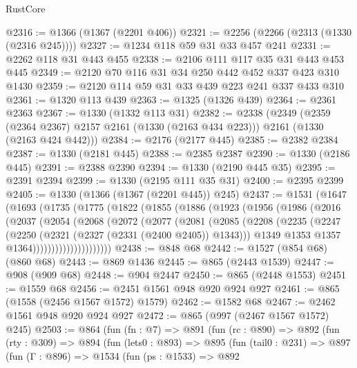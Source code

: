 \begin{lexlean}{RustCore}
\begin{coremodule}
@2316 := @1366 (@1367 (@2201 @406))
@2321 := @2256 (@2266 (@2313 (@1330 (@2316 @245))))
@2327 := @1234 @118 @59 @31 @33 @457 @241
@2331 := @2262 @118 @31 @443 @455
@2338 := @2106 @111 @117 @35 @31 @443 @453 @445
@2349 := @2120 @70 @116 @31 @34 @250 @442 @452 @337 @423 @310 @1430
@2359 := @2120 @114 @59 @31 @33 @439 @223 @241 @337 @433 @310
@2361 := @1320 @113 @439
@2363 := @1325 (@1326 @439)
@2364 := @2361 @2363
@2367 := @1330 (@1332 @113 @31)
@2382 := @2338
    (@2349
      (@2359 (@2364 @2367) @2157 @2161 (@1330 (@2163 @434 @223)))
      @2161
      (@1330 (@2163 @424 @442)))
@2384 := @2176 (@2177 @445)
@2385 := @2382 @2384
@2387 := @1330 (@2181 @445)
@2388 := @2385 @2387
@2390 := @1330 (@2186 @445)
@2391 := @2388 @2390
@2394 := @1330 (@2190 @445 @35)
@2395 := @2391 @2394
@2399 := @1330 (@2195 @111 @35 @31)
@2400 := @2395 @2399
@2405 := @1330 (@1366 (@1367 (@2201 @445)) @245)
@2437 := @1531
    (@1647
      (@1693
        (@1735
          (@1775
            (@1822
              (@1855
                (@1886
                  (@1923
                    (@1956
                      (@1986
                        (@2016
                          (@2037
                            (@2054
                              (@2068
                                (@2072
                                  (@2077
                                    (@2081
                                      (@2085
                                        (@2208
                                          (@2235
                                            (@2247
                                              (@2250 (@2321 (@2327 (@2331 (@2400 @2405)) @1343)))
                                              @1349
                                              @1353
                                              @1357
                                              @1364)))))))))))))))))))))
@2438 := @848 @68
@2442 := @1527 (@854 @68) (@860 @68)
@2443 := @869 @1436
@2445 := @865 (@2443 @1539)
@2447 := @908 (@909 @68)
@2448 := @904 @2447
@2450 := @865 (@2448 @1553)
@2451 := @1559 @68
@2456 := @2451 @1561 @948 @920 @924 @927
@2461 := @865 (@1558 (@2456 @1567 @1572) @1579)
@2462 := @1582 @68
@2467 := @2462 @1561 @948 @920 @924 @927
@2472 := @865 (@997 (@2467 @1567 @1572) @245)
@2503 := @864
    (fun (fn : @7) =>
    @891
      (fun (rc : @890) =>
      @892
        (fun (rty : @309) =>
        @894
          (fun (lets0 : @893) =>
          @895
            (fun (tail0 : @231) =>
            @897
              (fun (Γ : @896) =>
              @1534
                (fun (ps : @1533) =>
                @892

\end{coremodule}
\end{lexlean}
